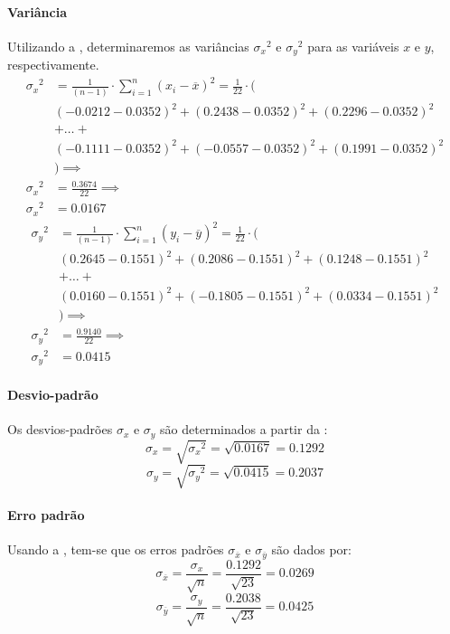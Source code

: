 \begin{resolucao}
\paragraph{Variância} Utilizando a , determinaremos
as variâncias ${\sigma_x}^2$ e ${\sigma_y}^2$
para as variáveis $x$ e $y$, respectivamente.
\begin{align*}
    {\sigma_x}^2 &=
        \frac{1}{(n-1)} \cdot \sum_{i=1}^{n} (x_i - \overline{x})^2 =
        \frac{1}{22} \cdot \Big( \\
    & ( -0.0212 - 0.0352 )^2 + ( 0.2438 - 0.0352 )^2 + ( 0.2296 - 0.0352 )^2 \\
    & + \ldots + \\
    & ( -0.1111 - 0.0352 )^2 + ( -0.0557 - 0.0352 )^2 + ( 0.1991 - 0.0352)^2 \\
    & \Big) \implies \\
    {\sigma_x}^2 &= \frac{0.3674}{22} \implies \\
    {\sigma_x}^2 &= 0.0167
\end{align*}
\begin{align*}
    {\sigma_y}^2 &=
        \frac{1}{(n-1)} \cdot \sum_{i=1}^{n} (y_i - \overline{y})^2 =
        \frac{1}{22} \cdot \Big( \\
    & ( 0.2645 - 0.1551 )^2 + ( 0.2086 - 0.1551 )^2 + ( 0.1248 - 0.1551 )^2 \\
    & + \ldots + \\
    & ( 0.0160 - 0.1551 )^2 + ( -0.1805 - 0.1551 )^2 + ( 0.0334 - 0.1551 )^2 \\
    & \Big) \implies \\
    {\sigma_y}^2 &= \frac{0.9140}{22} \implies \\
    {\sigma_y}^2 &= 0.0415
\end{align*}

\paragraph{Desvio-padrão} Os desvios-padrões $\sigma_x$ e $\sigma_y$ são
determinados a partir da :
\[
    \sigma_x = \sqrt{{\sigma_x}^2} = \sqrt{0.0167} = 0.1292
\]
\[
    \sigma_y = \sqrt{{\sigma_y}^2} = \sqrt{0.0415} = 0.2037
\]

\paragraph{Erro padrão} Usando a , tem-se que os erros
padrões $\sigma_{\overline{x}}$ e $\sigma_{\overline{y}}$ são dados por:
\[
\sigma_{\overline{x}} = \frac{\sigma_x}{\sqrt{n}} =
    \frac{0.1292}{\sqrt{23}} = 0.0269
\]
\[
\sigma_{\overline{y}} = \frac{\sigma_y}{\sqrt{n}} =
    \frac{0.2038}{\sqrt{23}} = 0.0425
\]


\end{resolucao}
